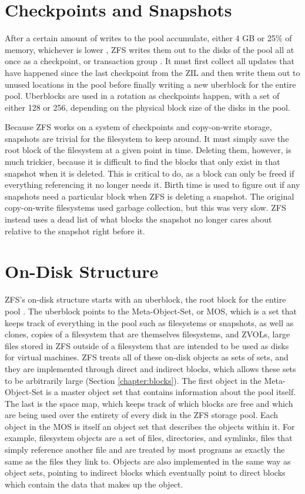 \section{Checkpoints and Snapshots}
After a certain amount of writes to the pool accumulate, either 4 GB or 25\% of memory, whichever is lower 
\cite[{module/zfs/arc.c}]{zfs},
ZFS writes them out to the disks of the pool all at once as a checkpoint, or transaction group
\cite{ahrens_read_write,mckusick_zfs_2015_presentation}.
It must first collect all updates that have happened since the last checkpoint from the ZIL
and then write them out to unused locations in the pool before finally writing a new uberblock for the entire pool.
Uberblocks are used in a rotation as checkpoints happen, with a set of either 128 or 256, depending on the  physical block size
of the disks in the pool.

Because ZFS works on a system of checkpoints and copy-on-write storage, snapshots are trivial for the filesystem to keep around.
It must simply save the root block of the filesystem at a given point in time.
Deleting them, however, is much trickier, because it is difficult to find the blocks that only exist in that snapshot
when it is deleted.
This is critical to do, as a block can only be freed if everything referencing it no longer needs it.
Birth time is used to figure out if any snapshots need a particular block when ZFS is deleting a snapshot.
The original copy-on-write filesystems used garbage collection, but this was very slow.
ZFS instead uses a dead list of what blocks the snapshot no longer cares about relative to the snapshot right before it.

\section{On-Disk Structure}
ZFS's on-disk structure starts with an uberblock, the root block for the entire pool 
\cite{ahrens_read_write,mckusick_zfs_2015_presentation}.
The uberblock points to the Meta-Object-Set, or MOS, which is a set that keeps track of everything in the pool such as
filesystems or snapshots, as well as clones, copies of a filesystem that are themselves filesystems, 
and ZVOLs, large files stored in ZFS outside of a filesystem that are intended to be used as disks for virtual machines.
ZFS treats all of these on-disk objects as sets of sets, and they are implemented through direct and indirect blocks,
which allows these sets to be arbitrarily large (Section \ref{chapter:blocks}).
The first object in the Meta-Object-Set is a master object set that contains information about the pool itself.
The last is the space map, which keeps track of which blocks are free and which are being used over the entirety of
every disk in the ZFS storage pool.
Each object in the MOS is itself an object set that describes the objects within it.
For example, filesystem objects are a set of files, directories, and symlinks, files that simply reference another file and are
treated by most programs as exactly the same as the files they link to.
Objects are also implemented in the same way as object sets, pointing to indirect blocks which eventually point to direct blocks which 
contain the data that makes up the object.

